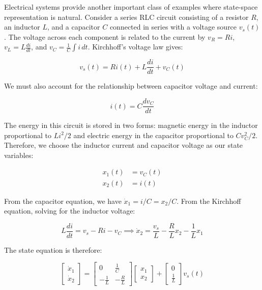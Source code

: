 Electrical systems provide another important class of examples where state-space representation is natural. Consider a series RLC circuit consisting of a resistor $R$, an inductor $L$, and a capacitor $C$ connected in series with a voltage source $v_s(t)$. The voltage across each component is related to the current by $v_R = Ri$, $v_L = L\frac{di}{dt}$, and $v_C = \frac{1}{C}\int i \, dt$. Kirchhoff's voltage law gives:

\begin{equation}
v_s(t) = Ri(t) + L\frac{di}{dt} + v_C(t)
\end{equation}

We must also account for the relationship between capacitor voltage and current:

\begin{equation}
i(t) = C\frac{dv_C}{dt}
\end{equation}

The energy in this circuit is stored in two forms: magnetic energy in the inductor proportional to $Li^2/2$ and electric energy in the capacitor proportional to $Cv_C^2/2$. Therefore, we choose the inductor current and capacitor voltage as our state variables:

\begin{subequations}
\begin{align}
x_1(t) &= v_C(t) \\
x_2(t) &= i(t)
\end{align}
\end{subequations}

From the capacitor equation, we have $\dot{x}_1 = i/C = x_2/C$. From the Kirchhoff equation, solving for the inductor voltage:

\begin{equation}
L\frac{di}{dt} = v_s - Ri - v_C \implies \dot{x}_2 = \frac{v_s}{L} - \frac{R}{L}x_2 - \frac{1}{L}x_1
\end{equation}

The state equation is therefore:

\begin{equation}
\begin{bmatrix}
\dot{x}_1 \\
\dot{x}_2
\end{bmatrix}
=
\begin{bmatrix}
0 & \frac{1}{C} \\
-\frac{1}{L} & -\frac{R}{L}
\end{bmatrix}
\begin{bmatrix}
x_1 \\
x_2
\end{bmatrix}
+
\begin{bmatrix}
0 \\ \frac{1}{L}
\end{bmatrix}
v_s(t)
\end{equation}

